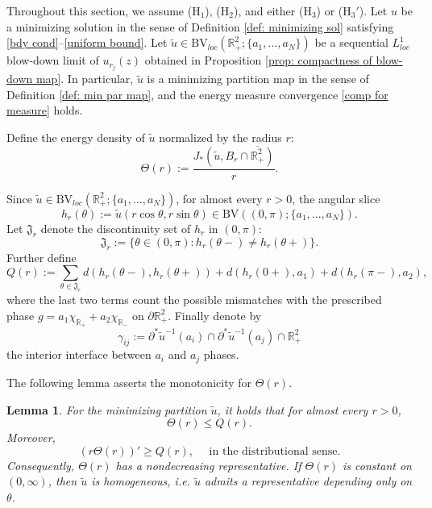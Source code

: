 \documentclass[leqno,11pt]{amsart}
\let\pa=\partial
\let\g=\gamma
\let\T=\Theta
\let\pa=\partial
\newtheorem{lemma}[theorem]{Lemma}
\theoremstyle{remark}
\newcommand{\BR}{\mathbb{R}}
\newcommand{\tu}{\tilde{u}}
\begin{document}
Throughout this section, we assume ($\mathrm{H}_1$), ($\mathrm{H}_2$), and either ($\mathrm{H}_3$) or ($\mathrm{H}_3'$). Let $u$ be a minimizing solution in the sense of Definition \ref{def: minimizing sol} satisfying \eqref{bdy cond}--\eqref{uniform bound}. Let $\tilde{u}\in \mathrm{BV}_{loc}(\BR_+^2;\{a_1,...,a_N\})$ be a sequential $L_{loc}^1$ blow-down limit of $u_{r_j}(z)$ obtained in Proposition \ref{prop: compactness of blow-down map}. In particular, $\tilde u$ is a minimizing partition map in the sense of Definition \ref{def: min par map}, and the energy measure convergence \eqref{comp for measure} holds.

Define the energy density of $\tu$ normalized by the radius $r$:
\begin{equation*}
    \T(r):= \frac{J_*(\tu, B_r\cap \overline{\BR_+^2})}{r}.
\end{equation*}

Since $\tu\in \mathrm{BV}_{loc}(\BR_+^2;\{a_1,...,a_N\})$, for almost every $r>0$, the angular slice  
\begin{equation*}
     h_r(\theta):=\tu(r\cos\theta,r\sin\theta)\in \mathrm{BV}((0,\pi);\{a_1,...,a_N\}). 
\end{equation*}
Let $\mathfrak{J}_r$ denote the discontinuity set of $h_r$ in $(0,\pi)$: 
\begin{equation*}
    \mathfrak{J}_r:= \{\theta\in (0,\pi): h_r(\theta-) \neq h_r(\theta+) \}.
\end{equation*}
Further define 
\begin{equation}\label{def:Qr}
    Q(r):= \sum_{\theta\in \mathfrak{J}_r} d(h_r(\theta-),h_r(\theta+))+ d(h_r(0+),a_1)+d(h_r(\pi-),a_2), 
\end{equation}
where the last two terms count the possible mismatches with the prescribed phase $g=a_1\chi_{\BR_+}+a_2\chi_{\BR_-}$ on $\pa \BR_+^2$. Finally denote by 
\begin{equation*}
    \g_{ij}:= \pa^*\tu^{-1}(a_i)\cap \pa^*\tu^{-1}(a_j)\cap \BR_+^2
\end{equation*}
the interior interface between $a_i$ and $a_j$ phases. 

The following lemma asserts the monotonicity for $\T(r)$.

\begin{lemma}\label{lemma:monotonicity}
    For the minimizing partition $\tu$, it holds that for almost every $r>0$, 
    \begin{equation}\label{eq: mon 1}
        \T(r)\leq Q(r).
    \end{equation}
    Moreover,
    \begin{equation}\label{eq: mon 2}
        (r\T(r))'\geq Q(r), \quad \text{ in the distributional sense}.
    \end{equation}
    Consequently, $\T(r)$ has a nondecreasing representative. If $\T(r)$ is constant on $(0,\infty)$, then $\tu$ is homogeneous, i.e. $\tu$ admits a representative depending only on $\theta$.
\end{lemma}
\end{document}
